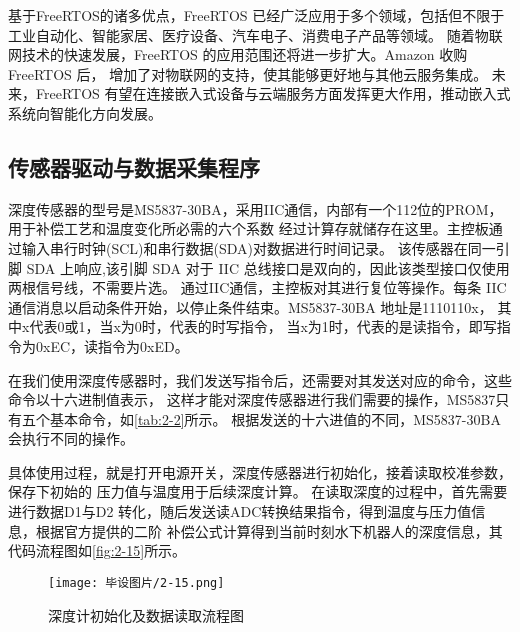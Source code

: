 基于FreeRTOS的诸多优点，FreeRTOS 已经广泛应用于多个领域，包括但不限于工业自动化、智能家居、医疗设备、汽车电子、消费电子产品等领域。
随着物联网技术的快速发展，FreeRTOS 的应用范围还将进一步扩大。Amazon 收购 FreeRTOS 后，
增加了对物联网的支持，使其能够更好地与其他云服务集成。
未来，FreeRTOS 有望在连接嵌入式设备与云端服务方面发挥更大作用，推动嵌入式系统向智能化方向发展。

\subsection{传感器驱动与数据采集程序 }
深度传感器的型号是MS5837-30BA，采用IIC通信，内部有一个112位的PROM，用于补偿工艺和温度变化所必需的六个系数
经过计算存就储存在这里。主控板通过输入串行时钟(SCL)和串行数据(SDA)对数据进行时间记录。
该传感器在同一引脚 SDA 上响应,该引脚 SDA 对于 IIC 总线接口是双向的，因此该类型接口仅使用两根信号线，不需要片选。
通过IIC通信，主控板对其进行复位等操作。每条 IIC 通信消息以启动条件开始，以停止条件结束。MS5837-30BA 地址是1110110x，
其中x代表0或1，当x为0时，代表的时写指令，
当x为1时，代表的是读指令，即写指令为0xEC，读指令为0xED。

在我们使用深度传感器时，我们发送写指令后，还需要对其发送对应的命令，这些命令以十六进制值表示，
这样才能对深度传感器进行我们需要的操作，MS5837只有五个基本命令，如\autoref{tab:2-2}所示。
根据发送的十六进值的不同，MS5837-30BA会执行不同的操作。
\begin{table}[H]
    \fangsong
    \caption{\label{tab:2-2}MS5837 十六进制值与对应的功能}
    \small %
    \centering%
    \renewcommand{\arraystretch}{1.5}
\end{table}
具体使用过程，就是打开电源开关，深度传感器进行初始化，接着读取校准参数，保存下初始的
压力值与温度用于后续深度计算。
在读取深度的过程中，首先需要进行数据D1与D2
转化，随后发送读ADC转换结果指令，得到温度与压力值信息，根据官方提供的二阶
补偿公式计算得到当前时刻水下机器人的深度信息，其代码流程图如\autoref{fig:2-15}所示。
\begin{figure}[htbp]
    \centering
    \texttt{[image: 毕设图片/2-15.png]}
    \caption{\label{fig:2-15} 深度计初始化及数据读取流程图}
\end{figure}

